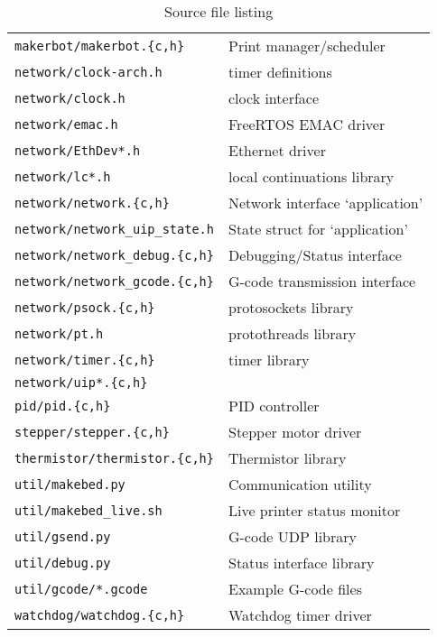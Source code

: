 \begin{table}
\begin{tabular}{p{} p{}}
				\addlinespace
				\verb|makerbot/makerbot.{c,h}| & Print manager/scheduler \\
				\addlinespace
				\verb|network/clock-arch.h| & \uIP{} timer definitions \\
				\verb|network/clock.h| & \uIP{} clock interface \\
				\verb|network/emac.h| & FreeRTOS EMAC driver \\
				\verb|network/EthDev*.h| & Ethernet driver \\
				\verb|network/lc*.h| & \uIP{} local continuations library \\
				\verb|network/network.{c,h}| & Network interface \uIP{} `application' \\
				\verb|network/network_uip_state.h| & State struct for \uIP{} `application' \\
				\verb|network/network_debug.{c,h}| & Debugging/Status interface \\
				\verb|network/network_gcode.{c,h}| & G-code transmission interface \\
				\verb|network/psock.{c,h}| & \uIP{} protosockets library \\
				\verb|network/pt.h| & \uIP{} protothreads library \\
				\verb|network/timer.{c,h}| & \uIP{} timer library \\
				\verb|network/uip*.{c,h}| & \uIP{} \\
				\addlinespace
				\verb|pid/pid.{c,h}| & PID controller \\
				\addlinespace
				\verb|stepper/stepper.{c,h}| & Stepper motor driver \\
				\addlinespace
				\verb|thermistor/thermistor.{c,h}| & Thermistor library \\
				\addlinespace
				\verb|util/makebed.py| & Communication utility \\
				\verb|util/makebed_live.sh| & Live printer status monitor\\
				\verb|util/gsend.py| & G-code UDP library \\
				\verb|util/debug.py| & Status interface library \\
				\verb|util/gcode/*.gcode| & Example G-code files \\
				\addlinespace
				\verb|watchdog/watchdog.{c,h}| & Watchdog timer driver \\
				\bottomrule
			\end{tabular}
			
			\caption{Source file listing}
			\label{tab:files}
		\end{table}
	
